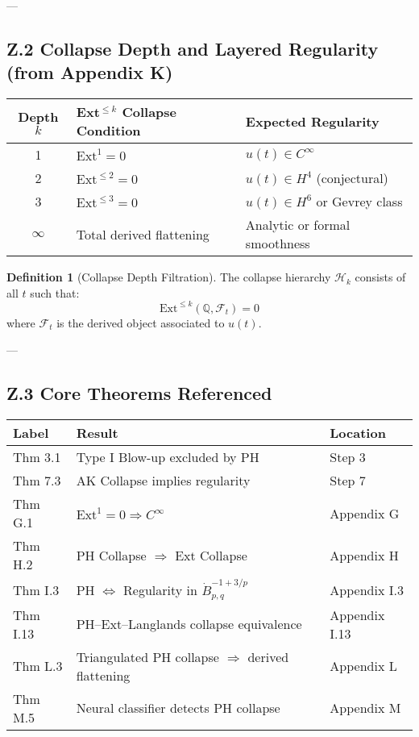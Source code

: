 \documentclass[11pt]{article}
\theoremstyle{definition}
\newtheorem{definition}[theorem]{Definition}
\begin{document}
---

\subsection*{Z.2 Collapse Depth and Layered Regularity (from Appendix K)}

\begin{center}
\renewcommand{\arraystretch}{1.3}
\begin{tabular}{|c|l|l|}
\hline
\textbf{Depth \( k \)} & \textbf{Ext$^{\leq k}$ Collapse Condition} & \textbf{Expected Regularity} \\
\hline
1 & $\mathrm{Ext}^1 = 0$ & $u(t) \in C^\infty$ \\
2 & $\mathrm{Ext}^{\leq 2} = 0$ & $u(t) \in H^4$ (conjectural) \\
3 & $\mathrm{Ext}^{\leq 3} = 0$ & $u(t) \in H^6$ or Gevrey class \\
$\infty$ & Total derived flattening & Analytic or formal smoothness \\
\hline
\end{tabular}
\end{center}

\begin{definition}[Collapse Depth Filtration]
The collapse hierarchy $\mathcal{H}_k$ consists of all $t$ such that:
\[
\mathrm{Ext}^{\leq k}(\mathbb{Q}, \mathcal{F}_t) = 0
\]
where $\mathcal{F}_t$ is the derived object associated to $u(t)$.
\end{definition}

---

\subsection*{Z.3 Core Theorems Referenced}

\begin{tabular}{lll}
\textbf{Label} & \textbf{Result} & \textbf{Location} \\
\hline
Thm 3.1 & Type I Blow-up excluded by PH & Step 3 \\
Thm 7.3 & AK Collapse implies regularity & Step 7 \\
Thm G.1 & $\mathrm{Ext}^1 = 0 \Rightarrow C^\infty$ & Appendix G \\
Thm H.2 & PH Collapse $\Rightarrow$ Ext Collapse & Appendix H \\
Thm I.3 & PH $\Leftrightarrow$ Regularity in $\dot{B}^{-1+3/p}_{p,q}$ & Appendix I.3 \\
Thm I.13 & PH–Ext–Langlands collapse equivalence & Appendix I.13 \\
Thm L.3 & Triangulated PH collapse $\Rightarrow$ derived flattening & Appendix L \\
Thm M.5 & Neural classifier detects PH collapse & Appendix M \\
\end{tabular}
\end{document}
